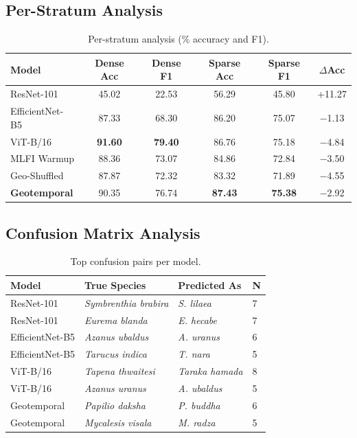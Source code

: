 \documentclass[runningheads]{llncs}
\begin{document}
\subsection{Per-Stratum Analysis}
\begin{table}[H]
    \centering
    \caption{Per-stratum analysis (\% accuracy and F1).}
    \small
    \begin{tabular}{@{}lccccc@{}}
        \toprule
        \textbf{Model} & \textbf{Dense Acc} & \textbf{Dense F1} & \textbf{Sparse Acc} & \textbf{Sparse F1} & \textbf{$\Delta$Acc} \\
        \midrule
        ResNet-101 & 45.02 & 22.53 & 56.29 & 45.80 & +11.27\\
        EfficientNet-B5 & 87.33 & 68.30 & 86.20 & 75.07 & $-$1.13\\
        ViT-B/16 & \textbf{91.60} & \textbf{79.40} & 86.76 & 75.18 & $-$4.84\\
        MLFI Warmup & 88.36 & 73.07 & 84.86 & 72.84 & $-$3.50\\
        Geo-Shuffled & 87.87 & 72.32 & 83.32 & 71.89 & $-$4.55\\
        \textbf{Geotemporal} & 90.35 & 76.74 & \textbf{87.43} & \textbf{75.38} & $-$2.92\\
        \bottomrule
    \end{tabular}
    \label{tab:per_stratum_analysis}
\end{table}
\subsection{Confusion Matrix Analysis}
\begin{table}[H]
    \centering
    \caption{Top confusion pairs per model.}
    \small
    \begin{tabular}{@{}llll@{}}
        \toprule
        \textbf{Model} & \textbf{True Species} & \textbf{Predicted As} & \textbf{N} \\
        \midrule
 ResNet-101 & \textit{Symbrenthia brabira} & \textit{S. lilaea} & 7 \\
 ResNet-101 & \textit{Eurema blanda} & \textit{E. hecabe} & 7 \\
 EfficientNet-B5 & \textit{Azanus ubaldus} & \textit{A. uranus} & 6 \\
 EfficientNet-B5 & \textit{Tarucus indica} & \textit{T. nara} & 5 \\
 ViT-B/16 & \textit{Tapena thwaitesi} & \textit{Taraka hamada} & 8 \\
 ViT-B/16 & \textit{Azanus uranus} & \textit{A. ubaldus} & 5 \\
 Geotemporal & \textit{Papilio daksha} & \textit{P. buddha} & 6 \\
 Geotemporal & \textit{Mycalesis visala} & \textit{M. radza} & 5 \\
        \bottomrule
    \end{tabular}
    \label{tab:confusion_matrix_analysis}
\end{table}
\end{document}
